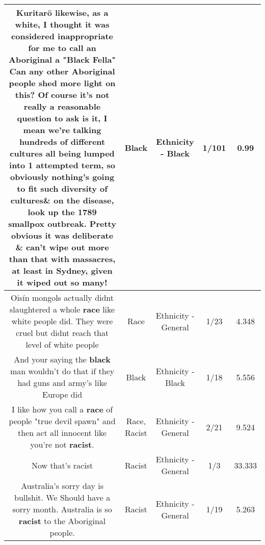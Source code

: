 \documentclass[11pt]{article}
\newlength\mylength
\begin{document}
\begin{center}
\begin{longtable}{|C{.65\mylength}|C{.30\mylength}|C{.12\mylength}|C{.12\mylength}|C{.12\mylength}|}
  \small Kuritarō likewise, as a white, I thought it was considered inappropriate for me to call an Aboriginal a "\textbf{Black} Fella" Can any other Aboriginal people shed more light on this? Of course it's not really a reasonable question to ask is it, I mean we're talking hundreds of different cultures all being lumped into 1 attempted term, so obviously nothing's going to fit such diversity of cultures\& on the disease, look up the 1789 smallpox outbreak. Pretty obvious it was deliberate \& can't wipe out more than that with massacres, at least in Sydney, given it wiped out so many!\normalsize   & Black & Ethnicity - Black & 1/101 & 0.99 \\  \hline
  \small Oisín mongols actually didnt slaughtered a whole \textbf{race} like white people did. They were cruel but didnt reach that level of white people\normalsize   & Race & Ethnicity - General & 1/23 & 4.348 \\  \hline
  \small And your saying the \textbf{black} man wouldn't do that if they had guns and army's like Europe did\normalsize   & Black & Ethnicity - Black & 1/18 & 5.556 \\  \hline
  \small I like how you call a \textbf{race} of people "true devil spawn" and then act all innocent like you're not \textbf{racist}.\normalsize   & Race, Racist & Ethnicity - General & 2/21 & 9.524 \\  \hline
  \small Now that's racist\normalsize   & Racist & Ethnicity - General & 1/3 & 33.333 \\  \hline
  \small Australia's sorry day is bullshit. We Should have a sorry month. Australia is so \textbf{racist} to the Aboriginal people.\normalsize   & Racist & Ethnicity - General & 1/19 & 5.263 \\  \hline

\end{longtable}
\end{center}
\end{document}
